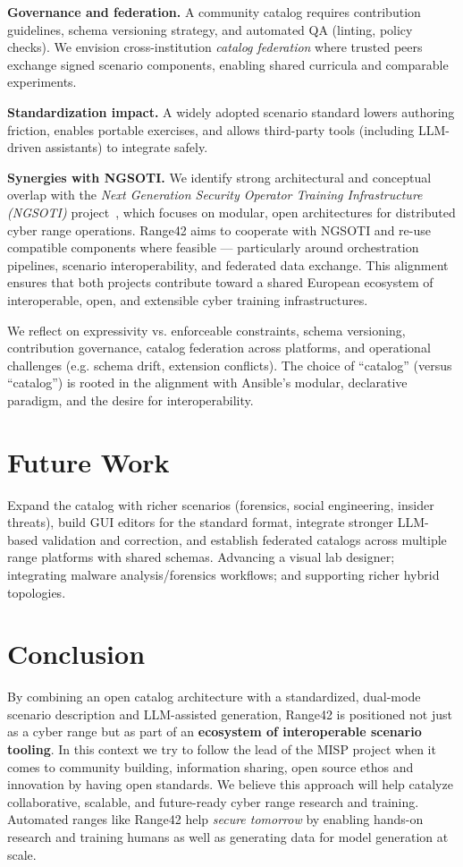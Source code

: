 \documentclass[11pt]{article}
\begin{document}
\textbf{Governance and federation.} A community catalog requires contribution guidelines, schema versioning strategy, and automated QA (linting, policy checks).
We envision cross-institution \emph{catalog federation} where trusted peers exchange signed scenario components, enabling shared curricula and comparable experiments.

\textbf{Standardization impact.} A widely adopted scenario standard lowers authoring friction, enables portable exercises, and allows third-party tools (including LLM-driven assistants) to integrate safely.

\textbf{Synergies with NGSOTI.} 
We identify strong architectural and conceptual overlap with the \emph{Next Generation Security Operator Training Infrastructure (NGSOTI)} project~\cite{ngsoti2025}, 
which focuses on modular, open architectures for distributed cyber range operations. 
Range42 aims to cooperate with NGSOTI and re-use compatible components where feasible --- particularly around orchestration pipelines, scenario interoperability, and federated data exchange. 
This alignment ensures that both projects contribute toward a shared European ecosystem of interoperable, open, and extensible cyber training infrastructures.

We reflect on expressivity vs. enforceable constraints, schema versioning, contribution governance, catalog federation across platforms, and operational challenges (e.g. schema drift, extension conflicts). The choice of “catalog” (versus “catalog”) is rooted in the alignment with Ansible’s modular, declarative paradigm, and the desire for interoperability.

\section{Future Work}
Expand the catalog with richer scenarios (forensics, social engineering, insider threats), build GUI editors for the standard format, integrate stronger LLM-based validation and correction, and establish federated catalogs across multiple range platforms with shared schemas. Advancing a visual lab designer; integrating malware analysis/forensics workflows; and supporting richer hybrid topologies.

\section{Conclusion}
By combining an open catalog architecture with a standardized, dual-mode scenario description and LLM-assisted generation, Range42 is positioned not just as a cyber range but as part of an \textbf{ecosystem of interoperable scenario tooling}. In this context we try to follow the lead of the MISP project when it comes to community building, information sharing, open source ethos and innovation by having open standards.
We believe this approach will help catalyze collaborative, scalable, and future-ready cyber range research and training.
Automated ranges like Range42 help \emph{secure tomorrow} by enabling hands-on research and training humans as well as generating data for model generation at scale. 
\end{document}
